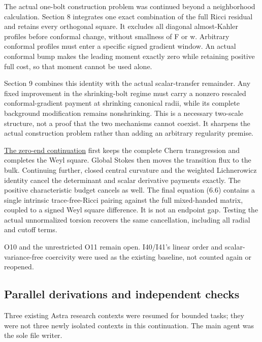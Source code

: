 \documentclass[
  10pt,
]{article}
\begin{document}
The actual one-bolt construction problem was continued beyond a
neighborhood calculation. Section 8 integrates one exact combination of
the full Ricci residual and retains every orthogonal square. It excludes
all diagonal almost-Kahler profiles before conformal change, without
smallness of F or w. Arbitrary conformal profiles must enter a specific
signed gradient window. An actual conformal bump makes the leading
moment exactly zero while retaining positive full cost, so that moment
cannot be used alone.

Section 9 combines this identity with the actual scalar-transfer
remainder. Any fixed improvement in the shrinking-bolt regime must carry
a nonzero rescaled conformal-gradient payment at shrinking canonical
radii, while its complete background modification remains nonshrinking.
This is a necessary two-scale structure, not a proof that the two
mechanisms cannot coexist. It sharpens the actual construction problem
rather than adding an arbitrary regularity premise.

\href{../continuation/20260928_signed_quartic_flux.md}{The zero-end
continuation} first keeps the complete Chern transgression and completes
the Weyl square. Global Stokes then moves the transition flux to the
bulk. Continuing further, closed central curvature and the weighted
Lichnerowicz identity cancel the determinant and scalar derivative
payments exactly. The positive characteristic budget cancels as well.
The final equation (6.6) contains a single intrinsic trace-free-Ricci
pairing against the full mixed-handed matrix, coupled to a signed Weyl
square difference. It is not an endpoint gap. Testing the actual
unnormalized torsion recovers the same cancellation, including all
radial and cutoff terms.

O10 and the unrestricted O11 remain open. I40/I41's linear order and
scalar-variance-free coercivity were used as the existing baseline, not
counted again or reopened.

\hypertarget{parallel-derivations-and-independent-checks}{%
\subsection{Parallel derivations and independent
checks}\label{parallel-derivations-and-independent-checks}}

Three existing Astra research contexts were resumed for bounded tasks;
they were not three newly isolated contexts in this continuation. The
main agent was the sole file writer.
\end{document}
